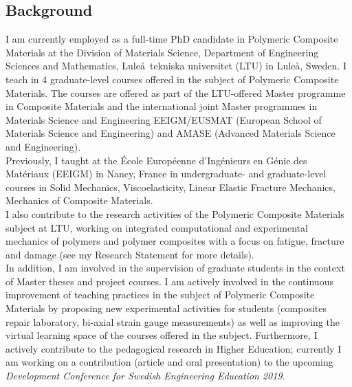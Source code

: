 \documentclass[
  a4paper, 
]{fortysecondscv}
\begin{document}
\makefrontsidebar

\hrulefill\hspace{5pt}\textbf{\thepage}

\subsection{Background}
I am currently employed as a full-time PhD candidate in Polymeric Composite Materials at the Division of Materials Science, Department of Engineering Sciences and Mathematics, Lule\aa\ tekniska universitet (LTU) in Lule\aa, Sweden. I teach in 4 graduate-level courses offered in the subject of Polymeric Composite Materials. The courses are offered as part of the LTU-offered Master programme in Composite Materials and the international joint Master programmes in Materials Science and Engineering EEIGM/EUSMAT (European School of Materials Science and Engineering) and AMASE (Advanced Materials Science and Engineering).\\ Previously, I taught at the \'Ecole Europ\'eenne d'Ing\'enieurs en G\'enie des Mat\'eriaux (EEIGM) in Nancy, France in undergraduate- and graduate-level courses in Solid Mechanics, Viscoelasticity, Linear Elastic Fracture Mechanics, Mechanics of Composite Materials.\\I also contribute to the research activities of the Polymeric Composite Materials subject at LTU, working on integrated computational and experimental mechanics of polymers and polymer composites with a focus on fatigue, fracture and damage (see my Research Statement for more details).\\In addition, I am involved in the supervision of graduate students in the context of Master theses and project courses. I am actively involved in the continuous improvement of teaching practices in the subject of Polymeric Composite Materials by proposing new experimental activities for students (composites repair laboratory, bi-axial strain gauge measurements) as well as improving the virtual learning space of the courses offered in the subject. Furthermore, I actively contribute to the pedagogical research in Higher Education; currently I am working on a contribution (article and oral presentation) to the upcoming \textit{Development Conference for Swedish Engineering Education 2019}.
\end{document}

